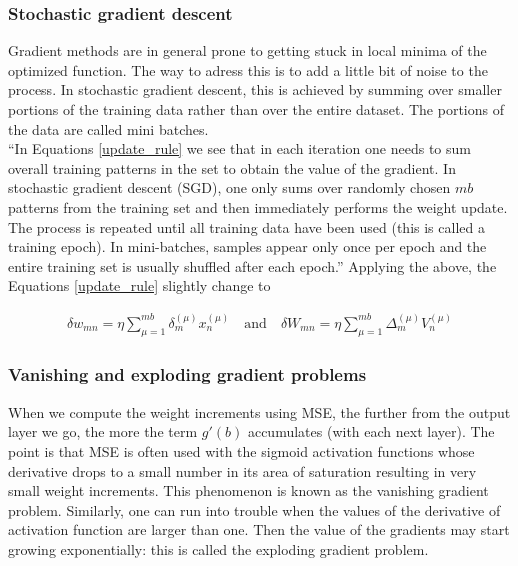 \subsubsection{Stochastic gradient descent}

Gradient methods are in general prone to getting stuck in local minima of the optimized function. The way to adress this is to add a little bit of noise to the process. In stochastic gradient descent, this is achieved by summing over smaller portions of the training data rather than over the entire dataset. The portions of the data are called mini batches. \cite{mehlig} \\

\enquote{In Equations \ref{update_rule} we see that in each iteration one needs to sum overall training patterns in the set to obtain the value of the gradient. In stochastic gradient descent (SGD), one only sums over randomly chosen $ mb $ patterns from the training set and then immediately performs the weight update. The process is repeated until all training data have been used (this is called a training epoch). In mini-batches, samples appear only once per epoch and the entire training set is usually shuffled after each epoch.} \cite{mehlig} Applying the above, the Equations \ref{update_rule} slightly change to \cite{mehlig}

\begin{gather}
\delta w_{mn} = \eta \sum\limits_{\mu=1}^{mb} \delta_{m}^{(\mu)} x_{n}^{(\mu)}
\quad \text{and} \quad 
\delta W_{mn} = \eta \sum\limits_{\mu=1}^{mb} \Delta_{m}^{(\mu)} V_{n}^{(\mu)}	
\end{gather}

\subsubsection{Vanishing and exploding gradient problems}

When we compute the weight increments using MSE, the further from the output layer we go, the more the term $ g'(b) $ accumulates (with each next layer). The point is that MSE is often used with the sigmoid activation functions whose derivative drops to a small number in its area of saturation resulting in very small weight increments. This phenomenon is known as the vanishing gradient problem. Similarly, one can run into trouble when the values of the derivative of activation function are larger than one. Then the value of the gradients may start growing exponentially: this is called the exploding gradient problem. \cite{eniola}


